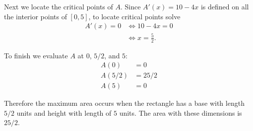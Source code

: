 \documentclass[nooutcomes]{ximera}
\begin{document}
\begin{problem}
\begin{freeResponse}
    Next we locate the critical points of $A$.
    Since $A'(x) = 10 - 4x$ is defined on all the interior points of $[0, 5]$, to locate critical points solve 
    \begin{align*}
      A'(x) = 0 &\iff 10 - 4x = 0\\
                &\iff x = \frac{5}{2}.
    \end{align*}

    To finish we evaluate $A$ at $0$, $5/2$, and $5$:
    \begin{align*}
      A(0) &= 0\\
      A(5/2) &= 25/2\\
      A(5) &= 0
    \end{align*}

    Therefore the maximum area occurs when the rectangle has a base with length $5/2$ units and height with length of $5$ units.
    The area with these dimensions is $25/2$.
  \end{freeResponse}
\end{problem}
\end{document}
